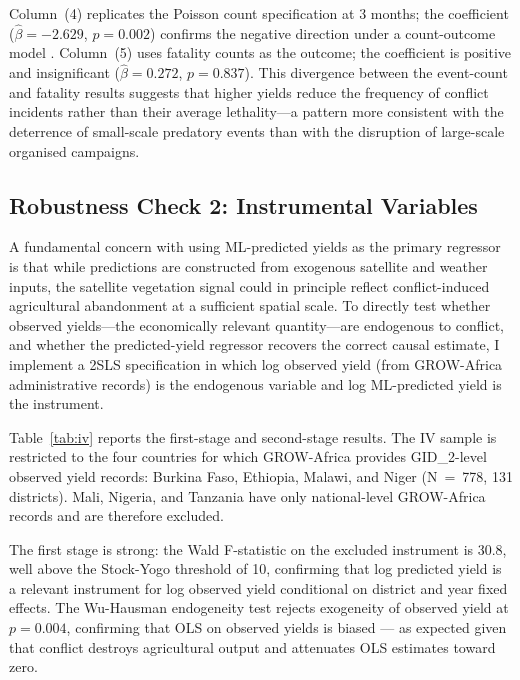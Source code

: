 Column~(4) replicates the Poisson count specification at 3 months; the coefficient ($\hat{\beta} = -2.629$, $p = 0.002$) confirms the negative direction under a count-outcome model \citep{SantosSilvaTenreyro2006}. Column~(5) uses fatality counts as the outcome; the coefficient is positive and insignificant ($\hat{\beta} = 0.272$, $p = 0.837$). This divergence between the event-count and fatality results suggests that higher yields reduce the frequency of conflict incidents rather than their average lethality---a pattern more consistent with the deterrence of small-scale predatory events than with the disruption of large-scale organised campaigns.

\subsection{Robustness Check 2: Instrumental Variables}

A fundamental concern with using ML-predicted yields as the primary regressor is that while predictions are constructed from exogenous satellite and weather inputs, the satellite vegetation signal could in principle reflect conflict-induced agricultural abandonment at a sufficient spatial scale. To directly test whether observed yields---the economically relevant quantity---are endogenous to conflict, and whether the predicted-yield regressor recovers the correct causal estimate, I implement a 2SLS specification in which log observed yield (from GROW-Africa administrative records) is the endogenous variable and log ML-predicted yield is the instrument.

Table~\ref{tab:iv} reports the first-stage and second-stage results. The IV sample is restricted to the four countries for which GROW-Africa provides GID_2-level observed yield records: Burkina Faso, Ethiopia, Malawi, and Niger (N~=~778, 131 districts). Mali, Nigeria, and Tanzania have only national-level GROW-Africa records and are therefore excluded.

\begin{table}[H]
\centering
\caption{Robustness Check: IV/2SLS with Observed Yield and Predicted Yield Instrument}
\label{tab:iv}
\begin{threeparttable}

\end{threeparttable}
\end{table}

The first stage is strong: the Wald F-statistic on the excluded instrument is 30.8, well above the Stock-Yogo threshold of 10, confirming that log predicted yield is a relevant instrument for log observed yield conditional on district and year fixed effects. The Wu-Hausman endogeneity test rejects exogeneity of observed yield at $p = 0.004$, confirming that OLS on observed yields is biased --- as expected given that conflict destroys agricultural output and attenuates OLS estimates toward zero.

